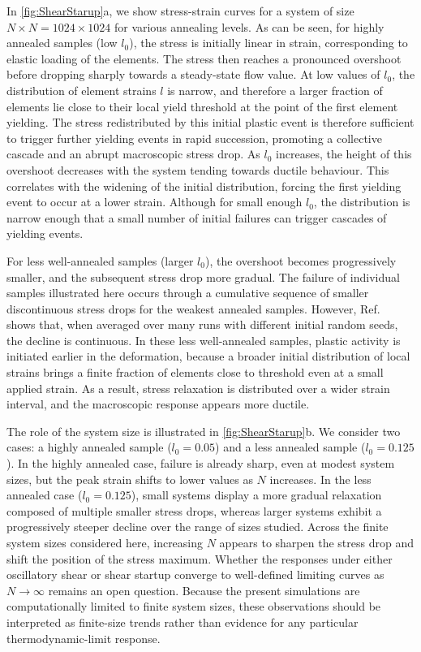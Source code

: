 In \cref{fig:ShearStarup}a, we show stress-strain curves for a system of size $N \times N = 1024 \times 1024$ for various annealing levels. As can be seen, for highly annealed samples  (low $l_0$), the stress is initially linear in strain, corresponding to elastic loading of the elements. The stress then reaches a pronounced overshoot before dropping sharply towards a steady-state flow value. At low values of $l_0$, the distribution of element strains $l$ is narrow, and therefore a larger fraction of elements lie close to their local yield threshold at the point of the first element yielding. The stress redistributed by this initial plastic event is therefore sufficient to trigger further yielding events in rapid succession, promoting a collective cascade and an abrupt macroscopic stress drop. As $l_0$ increases, the height of this overshoot decreases with the system tending towards ductile behaviour. This correlates with the widening of the initial distribution, forcing the first yielding event to occur at a lower strain. Although for small enough $l_0$, the distribution is narrow enough that a small number of initial failures can trigger cascades of yielding events.

For less well-annealed samples (larger $l_0$), the overshoot becomes progressively smaller, and the subsequent stress drop more gradual. The failure of individual samples illustrated here occurs through a cumulative sequence of smaller discontinuous stress drops for the weakest annealed samples. However, Ref.~\cite{pollard_yielding_2022} shows that, when averaged over many runs with different initial random seeds, the decline is continuous. In these less well-annealed samples, plastic activity is initiated earlier in the deformation, because a broader initial distribution of local strains brings a finite fraction of elements close to threshold even at a small applied strain. As a result, stress relaxation is distributed over a wider strain interval, and the macroscopic response appears more ductile.

The role of the system size is illustrated in \cref{fig:ShearStarup}b. We consider two cases: a highly annealed sample ($l_0=0.05$) and a less annealed sample ($l_0=0.125$). In the highly annealed case, failure is already sharp, even at modest system sizes, but the peak strain shifts to lower values as $N$ increases. In the less annealed case ($l_0=0.125$), small systems display a more gradual relaxation composed of multiple smaller stress drops, whereas larger systems exhibit a progressively steeper decline over the range of sizes studied. Across the finite system sizes considered here, increasing $N$ appears to sharpen the stress drop and shift the position of the stress maximum. Whether the responses under either oscillatory shear or shear startup converge to well-defined limiting curves as $N\to\infty$ remains an open question. Because the present simulations are computationally limited to finite system sizes, these observations should be interpreted as finite-size trends rather than evidence for any particular thermodynamic-limit response.

